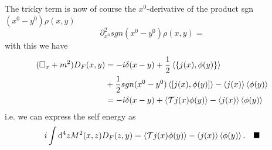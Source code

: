 The tricky term is now of course the $x^0$-derivative of the product sgn$(x^0-y^0)\rho(x,y)$
\begin{equation*}
	\partial^2_{x^0} sgn(x^0-y^0) \rho(x,y)=
\end{equation*}
with this we have
\begin{align*}
	(\square_x+m^2) D_F(x,y) &= -i \delta(x-y) + \frac{1}{2} \expval{\{j(x),\phi(y)\}} \\
	&+ \frac{1}{2} sgn(x^0-y^0) \expval{[j(x),\phi(y)]} - \expval{j(x)} \expval{\phi(y)}\\
	&=-i\delta(x-y) + \expval{\mathcal{T}j(x) \phi(y)} - \expval{j(x)} \expval{\phi(y)}
\end{align*}
i.e. we can express the self energy as
\begin{equation*}
	i \int \mathrm{d}^4 z M^2(x,z) D_F(z,y) = \expval{\mathcal{T} j(x) \phi(y)} - \expval{j(x)} \expval{\phi(y)}. \quad \blacksquare
\end{equation*}

